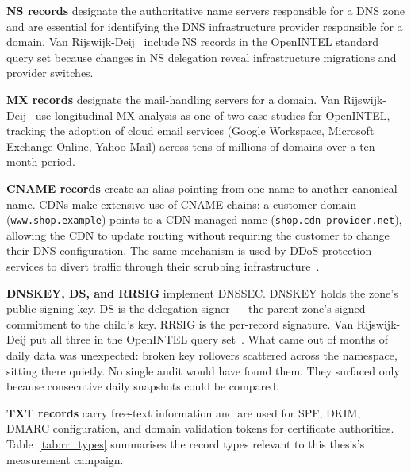 \textbf{\ac{NS} records} designate the authoritative name servers responsible for a \ac{DNS} zone and are essential for identifying the \ac{DNS} infrastructure provider responsible for a domain. Van Rijswijk-Deij~\cite{vanRijswijk2016} include \ac{NS} records in the OpenINTEL standard query set because changes in \ac{NS} delegation reveal infrastructure migrations and provider switches.

\textbf{\ac{MX} records} designate the mail-handling servers for a domain. Van Rijswijk-Deij~\cite{vanRijswijk2016} use longitudinal \ac{MX} analysis as one of two case studies for OpenINTEL, tracking the adoption of cloud email services (Google Workspace, Microsoft Exchange Online, Yahoo Mail) across tens of millions of domains over a ten-month period.

\textbf{\ac{CNAME} records} create an alias pointing from one name to another canonical name. \ac{CDN}s make extensive use of \ac{CNAME} chains: a customer domain (\texttt{www.shop.example}) points to a \ac{CDN}-managed name (\texttt{shop.cdn-provider.net}), allowing the \ac{CDN} to update routing without requiring the customer to change their \ac{DNS} configuration. The same mechanism is used by \ac{DDoS} protection services to divert traffic through their scrubbing infrastructure~\cite{Jonker2016}.

\textbf{DNSKEY, DS, and RRSIG} implement \ac{DNSSEC}. DNSKEY holds the zone's public signing key. DS is the delegation signer — the parent zone's signed commitment to the child's key. RRSIG is the per-record signature. Van Rijswijk-Deij put all three in the OpenINTEL query set~\cite{vanRijswijk2016}. What came out of months of daily data was unexpected: broken key rollovers scattered across the namespace, sitting there quietly. No single audit would have found them. They surfaced only because consecutive daily snapshots could be compared.

\textbf{\ac{TXT} records} carry free-text information and are used for \ac{SPF}, \ac{DKIM}, \ac{DMARC} configuration, and domain validation tokens for certificate authorities. Table~\ref{tab:rr_types} summarises the record types relevant to this thesis's measurement campaign.

